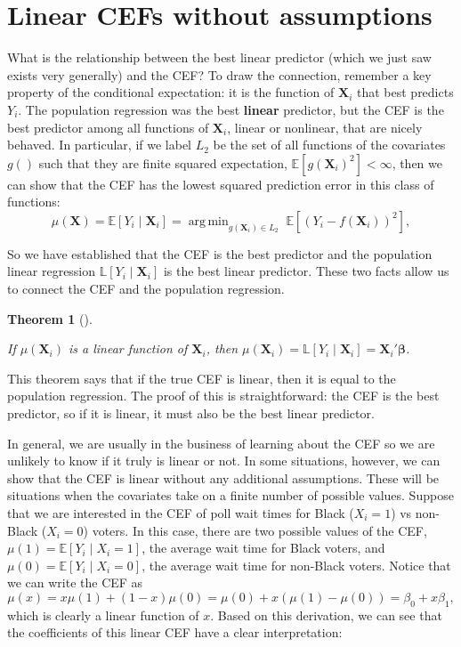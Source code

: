\documentclass[
  letterpaper,
  DIV=11,
  numbers=noendperiod]{scrreprt}
\newcommand{\mb}{\symbf}
\newcommand{\E}{\mathbb{E}}
\newcommand{\bbL}{\mathbb{L}}
\newcommand{\X}{\mb{X}}
\newcommand{\bfbeta}{\mb{\beta}}
\DeclareMathOperator*{\argmin}{arg\,min}
\theoremstyle{definition}
\theoremstyle{plain}
\newtheorem{theorem}{Theorem}[chapter]
\theoremstyle{definition}
\theoremstyle{remark}
\begin{document}
\hypertarget{linear-cefs-without-assumptions}{%
\section{Linear CEFs without
assumptions}\label{linear-cefs-without-assumptions}}

What is the relationship between the best linear predictor (which we
just saw exists very generally) and the CEF? To draw the connection,
remember a key property of the conditional expectation: it is the
function of \(\X_i\) that best predicts \(Y_{i}\). The population
regression was the best \textbf{linear} predictor, but the CEF is the
best predictor among all functions of \(\X_{i}\), linear or nonlinear,
that are nicely behaved. In particular, if we label \(L_2\) be the set
of all functions of the covariates \(g()\) such that they are finite
squared expectation, \(\E[g(\X_{i})^{2}] < \infty\), then we can show
that the CEF has the lowest squared prediction error in this class of
functions: \[ 
\mu(\X) = \E[Y_{i} \mid \X_{i}] = \argmin_{g(\X_i) \in L_2}\; \E\left[(Y_{i} - f(\X_{i}))^{2}\right],
\]

So we have established that the CEF is the best predictor and the
population linear regression \(\bbL[Y_{i}\mid \X_{i}]\) is the best
linear predictor. These two facts allow us to connect the CEF and the
population regression.

\leavevmode{}%
\begin{theorem}[]\label{thm-cef-blp}

If \(\mu(\X_{i})\) is a linear function of \(\X_i\), then
\(\mu(\X_{i}) = \bbL[Y_{i}\mid \X_{i}] = \X_i'\bfbeta\).

\end{theorem}

This theorem says that if the true CEF is linear, then it is equal to
the population regression. The proof of this is straightforward: the CEF
is the best predictor, so if it is linear, it must also be the best
linear predictor.

In general, we are usually in the business of learning about the CEF so
we are unlikely to know if it truly is linear or not. In some
situations, however, we can show that the CEF is linear without any
additional assumptions. These will be situations when the covariates
take on a finite number of possible values. Suppose that we are
interested in the CEF of poll wait times for Black (\(X_i = 1\)) vs
non-Black (\(X_i = 0\)) voters. In this case, there are two possible
values of the CEF, \(\mu(1) = \E[Y_{i}\mid X_{i}= 1]\), the average wait
time for Black voters, and \(\mu(0) = \E[Y_{i}\mid X_{i} = 0]\), the
average wait time for non-Black voters. Notice that we can write the CEF
as \[ 
\mu(x) = x \mu(1) + (1 - x) \mu(0) = \mu(0) + x\left(\mu(1) - \mu(0)\right)= \beta_0 + x\beta_1,
\] which is clearly a linear function of \(x\). Based on this
derivation, we can see that the coefficients of this linear CEF have a
clear interpretation:
\end{document}
